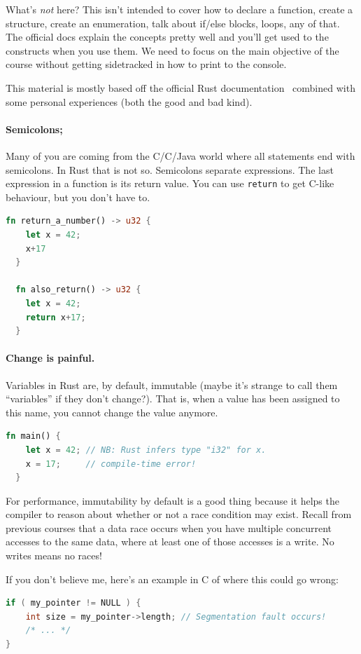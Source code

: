 \documentclass[a4paper]{report}
\newcommand{\CPP}{C\nolinebreak\hspace{-.05em}\raisebox{.4ex}{\tiny\bf +}\nolinebreak\hspace{-.10em}\raisebox{.4ex}{\tiny\bf +}}
\def\CPP{{C\nolinebreak[4]\hspace{-.05em}\raisebox{.4ex}{\tiny\bf ++}}}
\begin{document}
What's \textit{not} here? This isn't intended to cover how to declare a function, create a structure, create an enumeration, talk about if/else blocks, loops, any of that. The official docs explain the concepts pretty well and you'll get used to the constructs when you use them. We need to focus on the main objective of the course without getting sidetracked in how to print to the console. 

This material is mostly based off the official Rust documentation~\cite{rustdocs} combined with some personal experiences (both the good and bad kind). 

\paragraph{Semicolons;} Many of you are coming from the C/\CPP/Java world where all statements end with semicolons. In Rust that is
not so. Semicolons separate expressions. The last expression in a function is its return value. You can use \texttt{return} to get
C-like behaviour, but you don't have to.
\begin{lstlisting}[language=Rust]
  fn return_a_number() -> u32 {
    let x = 42;
    x+17
  }

  fn also_return() -> u32 {
    let x = 42;
    return x+17;
  }
\end{lstlisting}

\paragraph{Change is painful.}
Variables in Rust are, by default, immutable (maybe it's strange to call them ``variables'' if they don't change?). That is, when a value has been assigned to this name, you cannot change the value anymore.
\begin{lstlisting}[language=Rust]
  fn main() {
    let x = 42; // NB: Rust infers type "i32" for x.
    x = 17;     // compile-time error!
  }
\end{lstlisting}

For performance, immutability by default is a good thing because it helps the compiler to reason about whether or not a race condition may exist. Recall from previous courses that a data race occurs when you have multiple concurrent accesses to the same data, where at least one of those accesses is a write. No writes means no races! 

If you don't believe me, here's an example in C of where this could go wrong:
\begin{lstlisting}[language=C]
if ( my_pointer != NULL ) {
    int size = my_pointer->length; // Segmentation fault occurs!
    /* ... */
}
\end{lstlisting}
\end{document}
